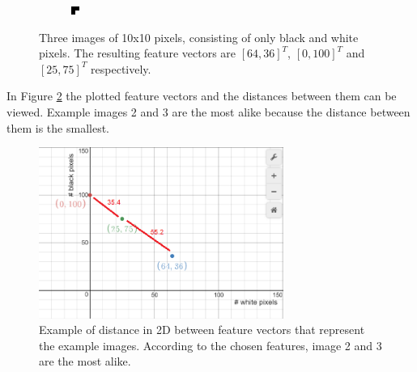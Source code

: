 \documentclass{article}
\begin{document}
\begin{figure}[H]
\begin{subfigure}[b]{0.2\textwidth}
	\end{subfigure}
	\begin{subfigure}[b]{0.2\textwidth}
		\includegraphics[width=\textwidth]{images/mostlyblack.png}
	\end{subfigure}
	\caption{Three images of 10x10 pixels, consisting of only black and white pixels. The resulting feature vectors are $[64,36]^T$, $[0, 100]^T$ and $[25,75]^T$ respectively.}
	\label{featurevectorimages}
\end{figure}

In Figure \ref{fig:distanceexample} the plotted feature vectors and the distances between them can be viewed. Example images 2 and 3 are the most alike because the distance between them is the smallest. 

\begin{figure}[H]
	\includegraphics[width=8cm]{images/distanceexample.png}
	\centering
	\caption{Example of distance in 2D between feature vectors that represent the example images. According to the chosen features, image 2 and 3 are the most alike.}
	\label{fig:distanceexample}
\end{figure}
\end{document}

